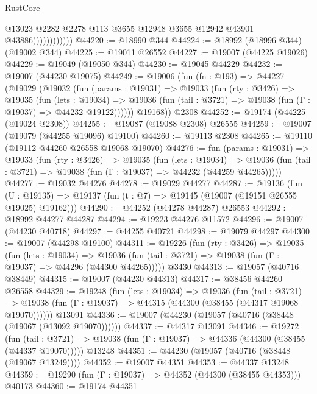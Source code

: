 \begin{lexlean}{RustCore}
\begin{coremodule}
                            @13023
                            @2282
                            @2278
                            @113
                            @3655
                            @12948
                            @3655
                            @12942
                            @43901
                            @43886))))))))))))
@44220 := @18990 @344
@44224 := @18992 (@18996 @344) (@19002 @344)
@44225 := @19011 @26552
@44227 := @19007 (@44225 @19026)
@44229 := @19049 (@19050 @344)
@44230 := @19045 @44229
@44232 := @19007 (@44230 @19075)
@44249 := @19006
    (fun (fn : @193) =>
    @44227
      (@19029
        (@19032
          (fun (params : @19031) =>
          @19033
            (fun (rty : @3426) =>
            @19035
              (fun (lets : @19034) =>
              @19036 (fun (tail : @3721) => @19038 (fun (Γ : @19037) => @44232 @19122))))))
        @19168))
    @2308
@44252 := @19174 (@44225 (@19024 @2308))
@44255 := @19087 (@19088 @2308) @26555
@44259 := @19007 (@19079 (@44255 @19096) @19100)
@44260 := @19113 @2308
@44265 := @19110 (@19112 @44260 @26558 @19068 @19070)
@44276 := fun (params : @19031) =>
  @19033
    (fun (rty : @3426) =>
    @19035
      (fun (lets : @19034) =>
      @19036 (fun (tail : @3721) => @19038 (fun (Γ : @19037) => @44232 (@44259 @44265)))))
@44277 := @19032 @44276
@44278 := @19029 @44277
@44287 := @19136
    (fun (U : @19135) => @19137 (fun (t : @7) => @19145 (@19007 (@19151 @26555 @19025) @19162)))
@44290 := @44252 (@44278 @44287) @26553
@44292 := @18992 @44277 @44287
@44294 := @19223 @44276 @11572
@44296 := @19007 (@44230 @40718)
@44297 := @44255 @40721
@44298 := @19079 @44297
@44300 := @19007 (@44298 @19100)
@44311 := @19226
    (fun (rty : @3426) =>
    @19035
      (fun (lets : @19034) =>
      @19036 (fun (tail : @3721) => @19038 (fun (Γ : @19037) => @44296 (@44300 @44265)))))
    @3430
@44313 := @19057 (@40716 @38449)
@44315 := @19007 (@44230 @44313)
@44317 := @38456 @44260 @26558
@44329 := @19248
    (fun (lets : @19034) =>
    @19036
      (fun (tail : @3721) =>
      @19038 (fun (Γ : @19037) => @44315 (@44300 (@38455 (@44317 @19068 @19070))))))
    @13091
@44336 := @19007 (@44230 (@19057 (@40716 (@38448 (@19067 (@13092 @19070))))))
@44337 := @44317 @13091
@44346 := @19272
    (fun (tail : @3721) => @19038 (fun (Γ : @19037) => @44336 (@44300 (@38455 (@44337 @19070)))))
    @13248
@44351 := @44230 (@19057 (@40716 (@38448 (@19067 @13249))))
@44352 := @19007 @44351
@44353 := @44337 @13248
@44359 := @19290 (fun (Γ : @19037) => @44352 (@44300 (@38455 @44353))) @40173
@44360 := @19174 @44351

\end{coremodule}
\end{lexlean}
